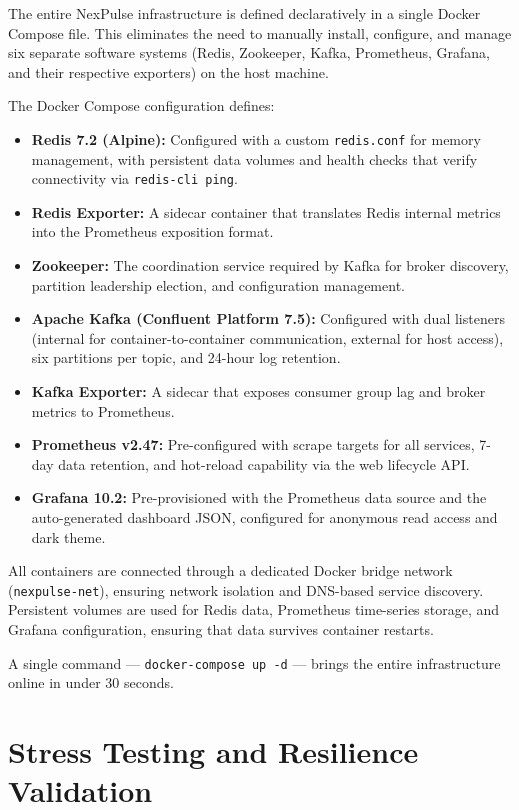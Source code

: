 \documentclass[12pt,a4paper]{article}
\begin{document}
The entire NexPulse infrastructure is defined declaratively in a single Docker Compose file. This eliminates the need to manually install, configure, and manage six separate software systems (Redis, Zookeeper, Kafka, Prometheus, Grafana, and their respective exporters) on the host machine.

The Docker Compose configuration defines:

\begin{itemize}[leftmargin=2em]
    \item \textbf{Redis 7.2 (Alpine):} Configured with a custom \texttt{redis.conf} for memory management, with persistent data volumes and health checks that verify connectivity via \texttt{redis-cli ping}.
    \item \textbf{Redis Exporter:} A sidecar container that translates Redis internal metrics into the Prometheus exposition format.
    \item \textbf{Zookeeper:} The coordination service required by Kafka for broker discovery, partition leadership election, and configuration management.
    \item \textbf{Apache Kafka (Confluent Platform 7.5):} Configured with dual listeners (internal for container-to-container communication, external for host access), six partitions per topic, and 24-hour log retention.
    \item \textbf{Kafka Exporter:} A sidecar that exposes consumer group lag and broker metrics to Prometheus.
    \item \textbf{Prometheus v2.47:} Pre-configured with scrape targets for all services, 7-day data retention, and hot-reload capability via the web lifecycle API.
    \item \textbf{Grafana 10.2:} Pre-provisioned with the Prometheus data source and the auto-generated dashboard JSON, configured for anonymous read access and dark theme.
\end{itemize}

All containers are connected through a dedicated Docker bridge network (\texttt{nexpulse-net}), ensuring network isolation and DNS-based service discovery. Persistent volumes are used for Redis data, Prometheus time-series storage, and Grafana configuration, ensuring that data survives container restarts.

A single command --- \texttt{docker-compose up -d} --- brings the entire infrastructure online in under 30 seconds.

\section{Stress Testing and Resilience Validation}
\end{document}
